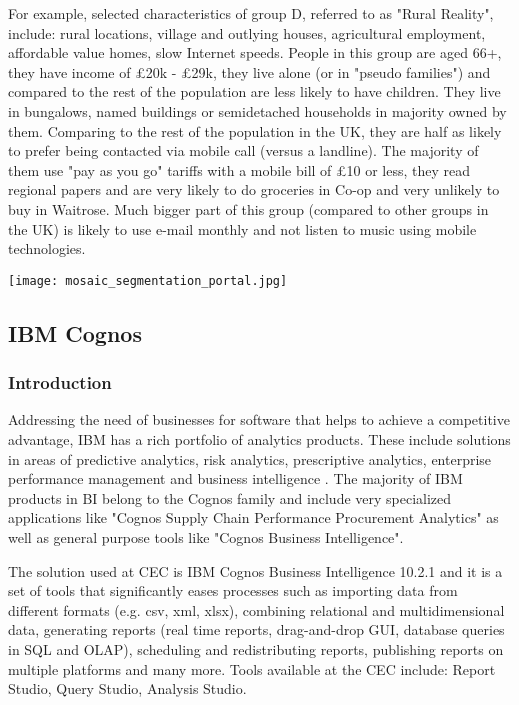 For example, selected characteristics of group D, referred to as "Rural Reality", include: rural locations, village and outlying houses, agricultural employment, affordable value homes, slow Internet speeds. People in this group are aged 66+, they have income of \pounds 20k - \pounds 29k, they live alone (or in "pseudo families") and compared to the rest of the population are less likely to have children. They live in bungalows, named buildings or semidetached households in majority owned by them. Comparing to the rest of the population in the UK, they are half as likely to prefer being contacted via  mobile call (versus a landline). The majority of them use "pay as you go" tariffs with a mobile bill of \pounds 10 or less, they read regional papers and are very likely to do groceries in Co-op and very unlikely to buy in Waitrose. Much bigger part of this group (compared to other groups in the UK) is likely to use e-mail monthly and not listen to music using mobile technologies. 

\begin{center}
  \texttt{[image: mosaic\_segmentation\_portal.jpg]}
  \label{normal_case}
\end{center}


		\subsection{IBM Cognos}
		
			\subsubsection{Introduction}
			
Addressing the need of businesses for software that helps to achieve a competitive advantage, IBM has a rich portfolio of analytics products. These include solutions in areas of predictive analytics, risk analytics, prescriptive analytics, enterprise performance management and business intelligence \citep{IBM2015b}. The majority of IBM products in BI belong to the Cognos family and include very specialized applications like "Cognos Supply Chain Performance Procurement Analytics" as well as general purpose tools like "Cognos Business Intelligence".

The solution used at CEC is IBM Cognos Business Intelligence 10.2.1 and it is a set of tools that significantly eases processes such as importing data from different formats (e.g. csv, xml, xlsx), combining relational and multidimensional data, generating reports (real time reports, drag-and-drop GUI, database queries in SQL and OLAP), scheduling and redistributing reports, publishing reports on multiple platforms and many more. Tools available at the CEC include: Report Studio, Query Studio, Analysis Studio.

